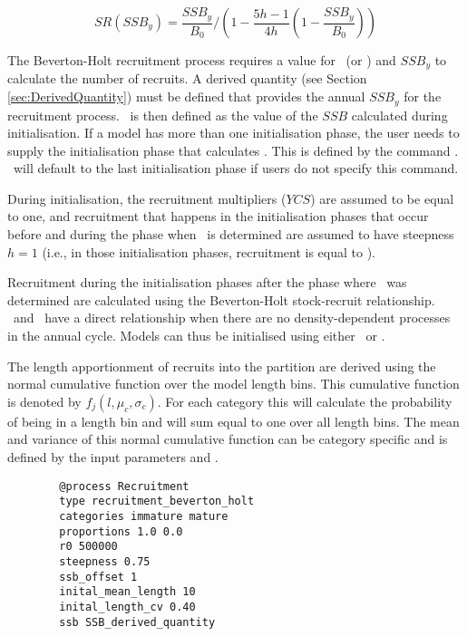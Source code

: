 \begin{equation}\label{eq:BH_SR}
SR(SSB_y) = \frac{SSB_y}{B_0} / \left( 1-\frac{5h-1}{4h} \left( 1-\frac{SSB_y}{B_0} \right) \right)
\end{equation}

The Beverton-Holt recruitment process requires a value for \Bzero\ (or \Rzero) and $SSB_y$ to calculate the number of recruits. A derived quantity (see Section \ref{sec:DerivedQuantity}) must be defined that provides the annual $SSB_y$ for the recruitment process. \Bzero\ is then defined as the value of the $SSB$ calculated during initialisation. If a model has more than one initialisation phase, the user needs to supply the initialisation phase that calculates \Bzero. This is defined by the command . \CNAME\ will default to the last initialisation phase if users do not specify this command.

During initialisation, the recruitment multipliers ($YCS$) are assumed to be equal to one, and recruitment that happens in the initialisation phases that occur before and during the phase when \Bzero\ is determined are assumed to have steepness $h=1$ (i.e., in those initialisation phases, recruitment is equal to \Rzero).

Recruitment during the initialisation phases after the phase where \Bzero\ was determined are calculated using the Beverton-Holt stock-recruit relationship. \Rzero\ and \Bzero\ have a direct relationship when there are no density-dependent processes in the annual cycle. Models can thus be initialised using either \Bzero\ or \Rzero.

The length apportionment of recruits into the partition are derived using the normal cumulative function over the model length bins. This cumulative function is denoted by \(f_j(l,\mu_c, \sigma_c)\). For each category this will calculate the probability of being in a length bin and will  sum equal to one over all length bins. The mean and variance of this normal cumulative function can be category specific and is defined by the input parameters  and .

{\small{\begin{verbatim}
		@process Recruitment
		type recruitment_beverton_holt
		categories immature mature
		proportions 1.0 0.0
		r0 500000
		steepness 0.75
		ssb_offset 1
		inital_mean_length 10
		inital_length_cv 0.40
		ssb SSB_derived_quantity
		\end{verbatim}}}

